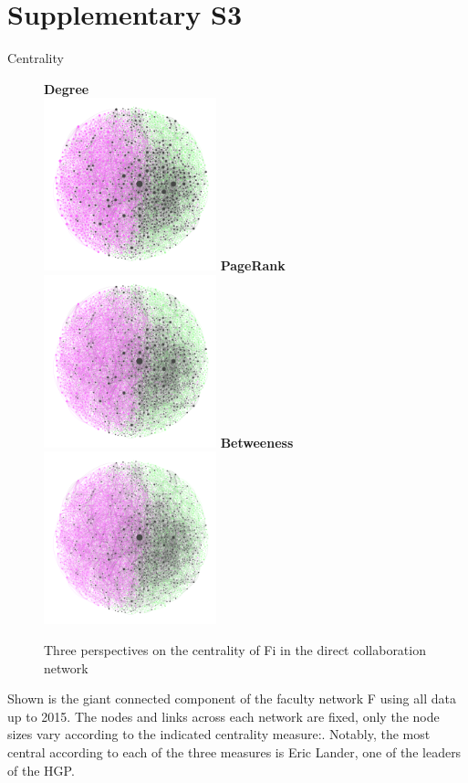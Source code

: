 \documentclass[10pt]{article}         %
\begin{document}
\newpage
\section{Supplementary S3}
Centrality\\
\begin{figure}[!htb]
    \textbf{Degree}\\
    \includegraphics[width=5cm, height=5cm]{S3Degree.png}
  \endminipage\hfill
    \textbf{PageRank}\\
    \includegraphics[width=5cm, height=5cm]{S3PageRank.png}
  \endminipage\hfill
    \textbf{Betweeness}\\
    \includegraphics[width=5cm, height=5cm]{S3Betweeness.png}
  \endminipage
  \caption{Three perspectives on the centrality of Fi in the direct collaboration network}
  \label{fig:s3}
\end{figure}

Shown is the giant connected component of the faculty network F using all data up to 2015. The nodes and links across each network are fixed, only the node sizes vary according to the indicated centrality measure:. Notably, the most central according to each of the three measures is Eric Lander, one of the leaders of the HGP.
\end{document}
